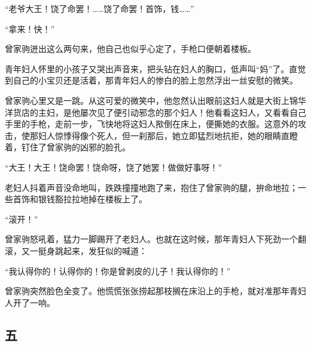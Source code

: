 \par “老爷大王！饶了命罢！……饶了命罢！首饰，钱……”
\par “拿来！快！”
\par 曾家驹迸出这么两句来，他自己也似乎心定了，手枪口便朝着楼板。
\par 青年妇人怀里的小孩子又哭出声音来，把头钻在妇人的胸口，低声叫“妈”了。直觉到自己的小宝贝还是活着，那青年妇人的惨白的脸上忽然浮出一丝安慰的微笑。
\par 曾家驹心里又是一跳。从这可爱的微笑中，他忽然认出眼前这妇人就是大街上锦华洋货店的主妇，是他屡次见了便引动邪念的那个妇人！他看看这妇人，又看看自己手里的手枪，走前一步，飞快地将这妇人揿倒在床上，便撕她的衣服。这意外的攻击，使那妇人惊悸得像个死人，但一刹那后，她立即猛烈地抗拒，她的眼睛直瞪着，钉住了曾家驹的凶邪的脸孔。
\par “大王！大王！饶命罢！饶命呀，饶了她罢！做做好事呀！”
\par 老妇人抖着声音没命地叫，跌跌撞撞地跑了来，抱住了曾家驹的腿，拚命地拉；一些首饰和银钱豁拉拉地掉在楼板上了。
\par “滚开！”
\par 曾家驹怒吼着，猛力一脚踢开了老妇人。也就在这时候，那年青妇人下死劲一个翻滚，又一挺身跳起来，发狂似的喊道：
\par “我认得你的！认得你的！你是曾剥皮的儿子！我认得你的！”
\par 曾家驹突然脸色全变了。他慌慌张张捞起那枝搁在床沿上的手枪，就对准那年青妇人开了一响。


\subsection*{五}


